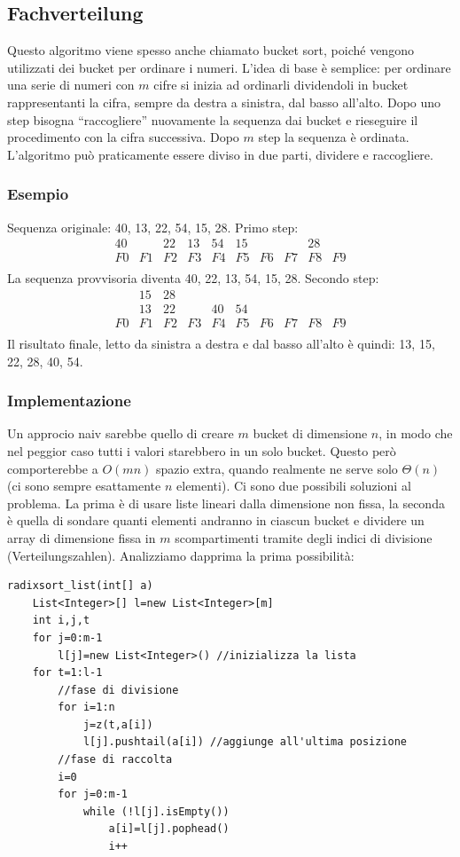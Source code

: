 \documentclass[a4paper]{book}
\begin{document}
\subsection{Fachverteilung}
Questo algoritmo viene spesso anche chiamato bucket sort, poiché vengono utilizzati dei bucket per ordinare i numeri. L'idea di base è semplice: per ordinare una serie di numeri con $m$ cifre si inizia ad ordinarli dividendoli in bucket rappresentanti la cifra, sempre da destra a sinistra, dal basso all'alto. Dopo uno step bisogna ``raccogliere'' nuovamente la sequenza dai bucket e rieseguire il procedimento con la cifra successiva. Dopo $m$ step la sequenza è ordinata. L'algoritmo può praticamente essere diviso in due parti, dividere e raccogliere.
\subsubsection*{Esempio}
Sequenza originale: 40, 13, 22, 54, 15, 28. Primo step:    
\[\begin{array}{*{20}{c}}
{40}&{ }&{22}&{13}&{54}&{15}&{ }&{ }&{28}&{ }\\
{F0}&{F1}&{F2}&{F3}&{F4}&{F5}&{F6}&{F7}&{F8}&{F9}\\
\end{array}\]
La sequenza provvisoria diventa 40, 22, 13, 54, 15, 28. Secondo step:
\[\begin{array}{*{20}{c}}
{ }&{15}&{28}&{ }&{ }&{ }&{ }&{ }&{ }&{ }\\
{ }&{13}&{22}&{ }&{40}&{54}&{ }&{ }&{ }&{ }\\
{F0}&{F1}&{F2}&{F3}&{F4}&{F5}&{F6}&{F7}&{F8}&{F9}\\
\end{array}\]
Il risultato finale, letto da sinistra a destra e dal basso all'alto è quindi: 13, 15, 22, 28, 40, 54.
\subsubsection*{Implementazione}
Un approcio naiv sarebbe quello di creare $m$ bucket di dimensione $n$, in modo che nel peggior caso tutti i valori starebbero in un solo bucket. Questo però comporterebbe a $O(mn)$ spazio extra, quando realmente ne serve solo $\Theta (n)$ (ci sono sempre esattamente $n$ elementi). Ci sono due possibili soluzioni al problema. La prima è di usare liste lineari dalla dimensione non fissa, la seconda è quella di sondare quanti elementi andranno in ciascun bucket e dividere un array di dimensione fissa in $m$ scompartimenti tramite degli indici di divisione (Verteilungszahlen). Analizziamo dapprima la prima possibilità:
\begin{lstlisting}
radixsort_list(int[] a)
	List<Integer>[] l=new List<Integer>[m]
	int i,j,t
	for j=0:m-1
		l[j]=new List<Integer>() //inizializza la lista
	for t=1:l-1
		//fase di divisione
		for i=1:n
			j=z(t,a[i])
			l[j].pushtail(a[i]) //aggiunge all'ultima posizione
		//fase di raccolta
		i=0
		for j=0:m-1
			while (!l[j].isEmpty())
				a[i]=l[j].pophead()
				i++
				
\end{lstlisting}
\end{document}

